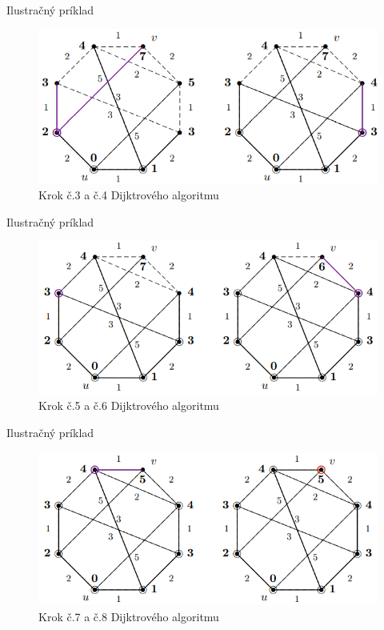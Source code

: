 \documentclass[15pt]{beamer}
\begin{document}
\begin{frame}{Ilustračný príklad}
	\begin{figure}
		\centering
		\includegraphics{imgs/dijkstra3.png}
		\caption{Krok č.3 a č.4 Dijktrového algoritmu}
		\label{fig:dijkstra3}
	\end{figure}
\end{frame}

\begin{frame}{Ilustračný príklad}
	\begin{figure}
		\centering
		\includegraphics{imgs/dijkstra4.png}
		\caption{Krok č.5 a č.6 Dijktrového algoritmu}
		\label{fig:dijkstra4}
	\end{figure}
\end{frame}

\begin{frame}{Ilustračný príklad}
	\begin{figure}
		\centering
		\includegraphics{imgs/dijkstra5.png}
		\caption{Krok č.7 a č.8 Dijktrového algoritmu}
		\label{fig:dijkstra5}
	\end{figure}
\end{frame}
\end{document}
